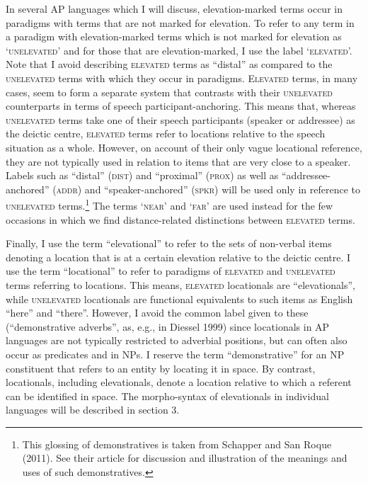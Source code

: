 In several AP languages which I will discuss, elevation-marked terms occur in paradigms with terms that are not marked for elevation. To refer to any term in a paradigm with elevation-marked terms which is not marked for elevation as {\textquoteleft}\textsc{unelevated}{\textquoteright} and for those that are elevation-marked, I use the label {\textquoteleft}\textsc{elevated{\textquoteright}.} Note that I avoid describing \textsc{elevated} terms as {\textquotedblleft}distal{\textquotedblright} as compared to the \textsc{unelevated }terms with which they occur in paradigms. E\textsc{levated} terms, in many cases, seem to form a separate system that contrasts with their \textsc{unelevated }counterparts\textsc{ }in terms of speech participant-anchoring. This means that, whereas \textsc{unelevated }terms take one of their speech participants (speaker or addressee) as the deictic centre, \textsc{elevated }terms refer to locations relative to the speech situation as a whole. However, on account of their only vague 
locational reference, they are not typically used in relation to items that are very close to a speaker. Labels such as {\textquotedblleft}distal{\textquotedblright} (\textsc{dist}) and {\textquotedblleft}proximal{\textquotedblright} (\textsc{prox}) as well as {\textquotedblleft}addressee-anchored{\textquotedblright} (\textsc{addr) }and {\textquotedblleft}speaker-anchored{\textquotedblright} (\textsc{spkr) }will be used only in reference to \textsc{unelevated }terms.\footnote{This glossing of demonstratives is taken from Schapper and San Roque (2011). See their article for discussion and illustration of the meanings and uses of such demonstratives.} The terms {\textquoteleft}\textsc{near}{\textquoteright} and {\textquoteleft}\textsc{far{\textquoteright}} are used instead for the few occasions in which we find distance-related distinctions between \textsc{elevated }terms.

Finally, I use the term {\textquotedblleft}elevational{\textquotedblright} to refer to the sets of non-verbal items denoting a location that is at a certain elevation relative to the deictic centre. I use the term {\textquotedblleft}locational{\textquotedblright} to refer to paradigms of \textsc{elevated }and \textsc{unelevated }terms referring to locations. This means, \textsc{elevated }locationals are {\textquotedblleft}elevationals{\textquotedblright}, while \textsc{unelevated} locationals are functional equivalents to such items as English {\textquotedblleft}here{\textquotedblright} and {\textquotedblleft}there{\textquotedblright}. However, I avoid the common label given to these ({\textquotedblleft}demonstrative adverbs{\textquotedblright}, as, e.g., in Diessel 1999) since locationals in AP languages are not typically restricted to adverbial positions, but can often also occur as predicates and in NPs. I reserve the term {\textquotedblleft}demonstrative{\textquotedblright} for an NP constituent that 
refers to an entity by locating it in space. By contrast, locationals, including elevationals, denote a location relative to which a referent can be identified in space. The morpho-syntax of elevationals in individual languages will be described in section 3.


